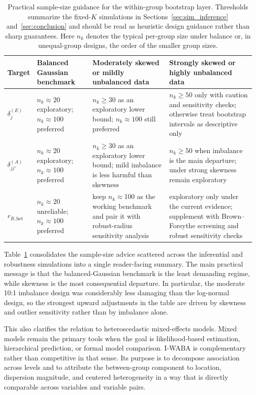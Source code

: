 \documentclass[preprint, times, 12pt, authoryear]{elsarticle}
\begin{document}
\begin{table}[ht]
	\centering
	\footnotesize
	\setlength{\tabcolsep}{3pt}
	\caption{Practical sample-size guidance for the within-group bootstrap layer. Thresholds summarize the fixed-$K$ simulations in Sections~\ref{sec:sim_inference} and~\ref{sec:conclusion} and should be read as heuristic design guidance rather than sharp guarantees. Here $n_k$ denotes the typical per-group size under balance or, in unequal-group designs, the order of the smaller group sizes.}
	\label{tab:sample_size_guidance}
	\begin{tabular}{p{2.2cm}p{2.9cm}p{3.3cm}p{3.3cm}}
		\toprule
		Target & Balanced Gaussian benchmark & Moderately skewed or mildly unbalanced data & Strongly skewed or highly unbalanced data \\
		\midrule
		$\delta_j^{(E)}$ &
		$n_k\approx 20$ exploratory; $n_k\approx 100$ preferred &
		$n_k\ge 30$ as an exploratory lower bound; $n_k\approx 100$ still preferred &
		$n_k\ge 50$ only with caution and sensitivity checks; otherwise treat bootstrap intervals as descriptive only \\
		$\delta_{jj'}^{(A)}$ &
		$n_k\approx 20$ exploratory; $n_k\approx 100$ preferred &
		$n_k\ge 30$ as an exploratory lower bound; mild imbalance is less harmful than skewness &
		$n_k\ge 50$ when imbalance is the main departure; under strong skewness remain exploratory \\
		$r_{R,\mathrm{het}}$ &
		$n_k\approx 20$ unreliable; $n_k\approx 100$ preferred &
		keep $n_k\approx 100$ as the working benchmark and pair it with robust-radius sensitivity analysis &
		exploratory only under the current evidence; supplement with Brown--Forsythe screening and robust sensitivity checks \\
		\bottomrule
	\end{tabular}
\end{table}

Table~\ref{tab:sample_size_guidance} consolidates the sample-size advice scattered across the inferential and robustness simulations into a single reader-facing summary. The main practical message is that the balanced-Gaussian benchmark is the least demanding regime, while skewness is the most consequential departure. In particular, the moderate 10{:}1 imbalance design was considerably less damaging than the log-normal design, so the strongest upward adjustments in the table are driven by skewness and outlier sensitivity rather than by imbalance alone.

This also clarifies the relation to heteroscedastic mixed-effects models. Mixed models remain the primary tools when the goal is likelihood-based estimation, hierarchical prediction, or formal model comparison. I-WABA is complementary rather than competitive in that sense. Its purpose is to decompose association across levels and to attribute the between-group component to location, dispersion magnitude, and centered heterogeneity in a way that is directly comparable across variables and variable pairs.
\end{document}
